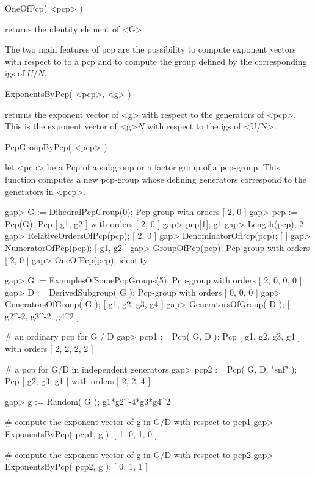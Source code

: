 
\>OneOfPcp( <pcp> )

returns the identity element of <G>.

\bigbreak
The two main  features of pcp are the  possibility to compute exponent
vectors  with respect to to   a pcp  and   to compute  the  group   defined by the
corresponding igs of $U/N$.

\>ExponentsByPcp( <pcp>, <g> )

returns the exponent vector  of <g> with  respect to the generators of
<pcp>.  This is the exponent vector of <g>$N$ with  respect to the igs
of <U/N>.

\>PcpGroupByPcp( <pcp> )

let <pcp> be a Pcp of a subgroup or a factor group of a pcp-group. This
function computes a new pcp-group whose defining generators correspond
to the generators in <pcp>.


\beginexample
gap>  G := DihedralPcpGroup(0);
Pcp-group with orders [ 2, 0 ]
gap>  pcp := Pcp(G);
Pcp [ g1, g2 ] with orders [ 2, 0 ]
gap>  pcp[1];
g1
gap>  Length(pcp);
2
gap>  RelativeOrdersOfPcp(pcp);
[ 2, 0 ]
gap>  DenominatorOfPcp(pcp);
[  ]
gap>  NumeratorOfPcp(pcp);
[ g1, g2 ]
gap>  GroupOfPcp(pcp);
Pcp-group with orders [ 2, 0 ]
gap> OneOfPcp(pcp);
identity
\endexample

\beginexample
gap> G := ExamplesOfSomePcpGroups(5);
Pcp-group with orders [ 2, 0, 0, 0 ]
gap> D := DerivedSubgroup( G );
Pcp-group with orders [ 0, 0, 0 ]
gap>  GeneratorsOfGroup( G );
[ g1, g2, g3, g4 ]
gap>  GeneratorsOfGroup( D );
[ g2^-2, g3^-2, g4^2 ]

# an ordinary pcp for G / D
gap> pcp1 := Pcp( G, D );
Pcp [ g1, g2, g3, g4 ] with orders [ 2, 2, 2, 2 ]

# a pcp for G/D in independent generators
gap>  pcp2 := Pcp( G, D, "snf" );
Pcp [ g2, g3, g1 ] with orders [ 2, 2, 4 ]

gap>  g := Random( G );
g1*g2^-4*g3*g4^2

# compute the exponent vector of g in G/D with respect to pcp1
gap> ExponentsByPcp( pcp1, g );
[ 1, 0, 1, 0 ]

# compute the exponent vector of g in G/D with respect to pcp2
gap>  ExponentsByPcp( pcp2, g );
[ 0, 1, 1 ]
\endexample



